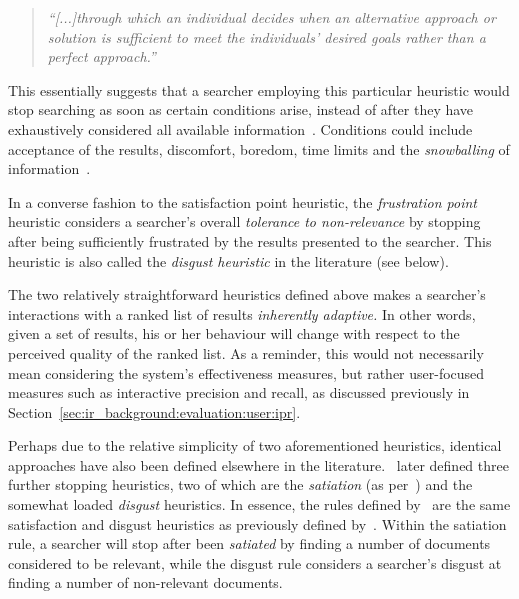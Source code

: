 \begin{quote}
    \emph{``[...]through which an individual decides when an alternative approach or solution is sufficient to meet the individuals' desired goals rather than a perfect approach.''}
\end{quote}

This essentially suggests that a searcher employing this particular heuristic would stop searching as soon as certain conditions arise, instead of after they have exhaustively considered all available information~\citep{march1994primer}. Conditions could include acceptance of the results, discomfort, boredom, time limits and the \emph{snowballing} of information~\citep{mansourian2007search}.

In a converse fashion to the satisfaction point heuristic, the \emph{frustration point} heuristic considers a searcher's overall \emph{tolerance to non-relevance} by stopping after being sufficiently frustrated by the results presented to the searcher. This heuristic is also called the \emph{disgust heuristic} in the literature (see below).

The two relatively straightforward heuristics defined above makes a searcher's interactions with a ranked list of results \emph{inherently adaptive.} In other words, given a set of results, his or her behaviour will change with respect to the perceived quality of the ranked list. As a reminder, this would not necessarily mean considering the system's effectiveness measures, but rather user-focused measures such as interactive precision and recall, as discussed previously in Section~\ref{sec:ir_background:evaluation:user:ipr}.

Perhaps due to the relative simplicity of two aforementioned heuristics, identical approaches have also been defined elsewhere in the literature.~\cite{kraft1979stopping_rules} later defined three further stopping heuristics, two of which are the \emph{satiation} (as per~\cite{simon1955satiation}) and the somewhat loaded \emph{disgust} heuristics. In essence, the rules defined by~\cite{kraft1979stopping_rules} are the same satisfaction and disgust heuristics as previously defined by~\cite{cooper1973retrieval_effectiveness_ii}. Within the satiation rule, a searcher will stop after been \emph{satiated} by finding a number of documents considered to be relevant, while the disgust rule considers a searcher's disgust at finding a number of non-relevant documents.

